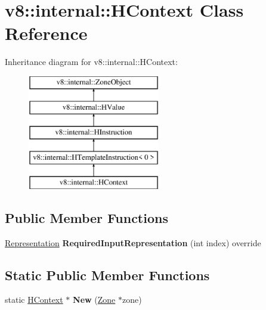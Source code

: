 \hypertarget{classv8_1_1internal_1_1_h_context}{}\section{v8\+:\+:internal\+:\+:H\+Context Class Reference}
\label{classv8_1_1internal_1_1_h_context}
Inheritance diagram for v8\+:\+:internal\+:\+:H\+Context\+:\begin{figure}[H]
\begin{center}
\leavevmode
\includegraphics[height=5.000000cm]{classv8_1_1internal_1_1_h_context}
\end{center}
\end{figure}
\subsection*{Public Member Functions}
\begin{DoxyCompactItemize}
\item 
\hyperlink{classv8_1_1internal_1_1_representation}{Representation} {\bfseries Required\+Input\+Representation} (int index) override\hypertarget{classv8_1_1internal_1_1_h_context_a7541c3c1f33121294daf55b8addac903}{}\label{classv8_1_1internal_1_1_h_context_a7541c3c1f33121294daf55b8addac903}

\end{DoxyCompactItemize}
\subsection*{Static Public Member Functions}
\begin{DoxyCompactItemize}
\item 
static \hyperlink{classv8_1_1internal_1_1_h_context}{H\+Context} $\ast$ {\bfseries New} (\hyperlink{classv8_1_1internal_1_1_zone}{Zone} $\ast$zone)\hypertarget{classv8_1_1internal_1_1_h_context_a1844d0e93b9fef240a01dbe5ee03fb37}{}\label{classv8_1_1internal_1_1_h_context_a1844d0e93b9fef240a01dbe5ee03fb37}

\end{DoxyCompactItemize}
